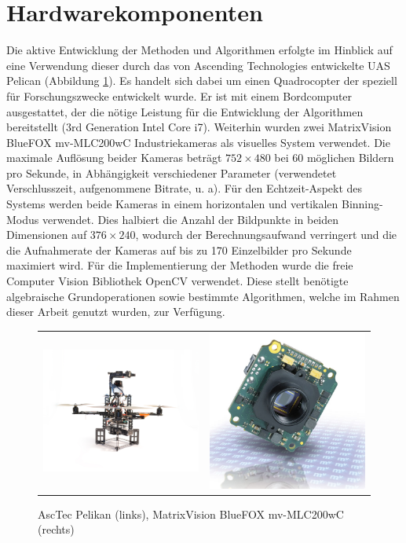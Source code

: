 \section{Hardwarekomponenten}
\label{sec:setup}

Die aktive Entwicklung der Methoden und Algorithmen erfolgte im Hinblick auf eine Verwendung dieser durch das von Ascending Technologies \cite{asctec} entwickelte UAS Pelican (Abbildung \ref{img:pelican}).
Es handelt sich dabei um einen Quadrocopter der speziell für Forschungszwecke entwickelt wurde. Er ist mit einem Bordcomputer ausgestattet, der die nötige Leistung für die Entwicklung der Algorithmen bereitstellt (3rd Generation Intel Core i7). Weiterhin wurden zwei MatrixVision BlueFOX mv-MLC200wC Industriekameras \cite{matrixvision} als visuelles System verwendet. Die maximale Auflösung beider Kameras beträgt $752\times480$ bei 60 möglichen Bildern pro Sekunde, in Abhängigkeit verschiedener Parameter (verwendetet Verschlusszeit, aufgenommene Bitrate, u. a). Für den Echtzeit-Aspekt des Systems werden beide Kameras in einem horizontalen und vertikalen Binning-Modus verwendet. Dies halbiert die Anzahl der Bildpunkte in beiden Dimensionen auf $376\times240$, wodurch der Berechnungsaufwand verringert und die die Aufnahmerate der Kameras auf bis zu 170 Einzelbilder pro Sekunde maximiert wird.
\noindent
Für die Implementierung der Methoden wurde die freie Computer Vision Bibliothek OpenCV \cite{opencv} verwendet. Diese stellt benötigte algebraische Grundoperationen sowie bestimmte Algorithmen, welche im Rahmen dieser Arbeit genutzt wurden, zur Verfügung.
\begin{figure}[h]
	\centering
	\begin{tabular}{cc}
	\includegraphics[width=6cm]{img/pelican} &
	\includegraphics[width=6cm]{img/camera}
	\end{tabular}
	\caption{AscTec Pelikan (links), MatrixVision BlueFOX mv-MLC200wC (rechts)}
	\label{img:pelican}
\end{figure}


